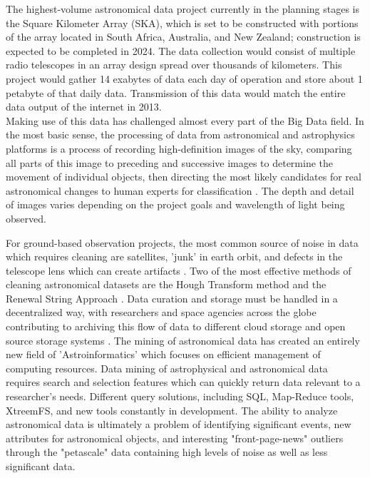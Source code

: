 \documentclass[sigconf]{acmart}
\begin{document}
The highest-volume astronomical data project currently in the planning stages is the Square Kilometer Array (SKA), which is set to be constructed with portions of the array located in South Africa, Australia, and New Zealand; construction is expected to be completed in 2024. The data collection would consist of multiple radio telescopes in an array design spread over thousands of kilometers. This project would gather 14 exabytes of data each day of operation and store about 1 petabyte of\cite{Economist2010} that daily data\cite{IBM2012}. Transmission of this data would match the entire data output of the internet in 2013\cite{Andersen2012}. \\

Making use of this data has challenged almost every part of the Big Data field. In the most basic sense, the processing of data from astronomical and astrophysics platforms is a process of recording high-definition images of the sky, comparing all parts of this image to preceding and successive images to determine the movement of individual objects, then directing the most likely candidates for real astronomical changes to human experts for classification \cite{Enke2012}. The depth and detail of images varies depending on the project goals and wavelength of light being observed. 

\cite{Stephens2015}For ground-based observation projects, the most common source of noise in data which requires cleaning are satellites, 'junk' in earth orbit, and defects in the telescope lens which can create artifacts \cite{Storkey2003a}. Two of the most effective methods of cleaning astronomical datasets are the Hough Transform method and the Renewal String Approach \cite{Antolovic2008,Storkey2003} \cite{Storkey2003a}. Data curation and storage must be handled in a decentralized way, with researchers and space agencies across the globe contributing to archiving this flow of data to different cloud storage and open source storage systems \cite{Gannon2014,Stephens2008}. The mining of astronomical data has created an entirely new field of 'Astroinformatics'\cite{Borne2009} which focuses on efficient management of computing resources. Data mining of astrophysical and astronomical data requires search and selection features which can quickly return data relevant to a researcher's needs\cite{Ivezic2014,Stephens2010}. Different query solutions, including SQL, Map-Reduce tools, XtreemFS, and new tools constantly in development\cite{Enke2012,Sellam2013}. The ability to analyze astronomical data is ultimately a problem of identifying significant events, new attributes for astronomical objects, and interesting "front-page-news" outliers through the "petascale"\cite{Borne2008} data containing high levels of noise as well as less significant data.
 
\end{document}
